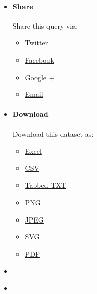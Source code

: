 \documentclass[
]{article}
\providecommand{\tightlist}{%
  \setlength{\itemsep}{0pt}\setlength{\parskip}{0pt}}
\begin{document}
\begin{itemize}
\tightlist
\item
  \protect\hypertarget{shareLink}{\href{javascript:void(0)}{{}}}

  \hypertarget{shareLinkDesc}{}
  \hypertarget{share}{%
  \paragraph{\texorpdfstring{Share{}}{Share}}\label{share}}

  Share this query via:

  \begin{itemize}
  \tightlist
  \item
    \href{Javascript:Widgettwitter()}{Twitter}
  \item
    \href{Javascript:Widgetfacebook();}{Facebook}
  \item
    \href{Javascript:WidgetGooglePlus();}{Google +}
  \item
    \href{Javascript:WidgetEmail();}{Email}
  \end{itemize}
\item
  \protect\hypertarget{downloadLink}{\href{javascript:void(0)}{{}}}

  \hypertarget{downloadLinkDesc}{}
  \hypertarget{download}{%
  \paragraph{\texorpdfstring{Download{}}{Download}}\label{download}}

  Download this dataset as:

  \begin{itemize}
  \tightlist
  \item
    \href{javascript:fileDownloadClick(\textquotesingle{}.file-excel\textquotesingle{})}{Excel}
  \item
    \href{javascript:fileDownloadClick(\textquotesingle{}.file-csv\textquotesingle{})}{CSV}
  \item
    \href{javascript:fileDownloadClick(\textquotesingle{}.file-tab\textquotesingle{})}{Tabbed
    TXT}
  \item
    \href{javascript:exportReport(\textquotesingle{}png\textquotesingle{})}{PNG}
  \item
    \href{javascript:exportReport(\textquotesingle{}jpeg\textquotesingle{})}{JPEG}
  \item
    \href{javascript:exportReport(\textquotesingle{}svg\textquotesingle{})}{SVG}
  \item
    \href{javascript:exportReport(\textquotesingle{}pdf\textquotesingle{})}{PDF}
  \end{itemize}
\item
  \protect\hypertarget{printLink}{\href{javascript:exportReport(\textquotesingle{}print\textquotesingle{})}{{}}}
\item
  \protect\hypertarget{infoLink}{\href{javascript:void(0)}{{}}}


\end{itemize}
\end{document}
